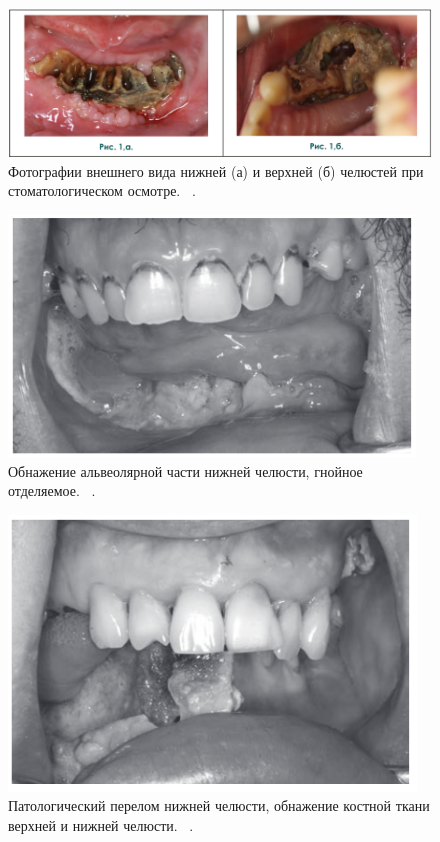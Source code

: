 \documentclass[11pt]{article}
\begin{document}
	\begin{figure}[H]
	\centering
	\includegraphics[width=\textwidth]{ris_2}
	\caption{Фотографии внешнего вида нижней (а) и верхней (б) челюстей при стоматологическом 
		осмотре. ~\cite{rejr}.}
	\label{fig:ris_2}
	\end{figure}
	
	\begin{figure}[H]
	\centering
	\includegraphics[width=\textwidth]{st1}
	\caption{Обнажение альвеолярной части нижней челюсти, гнойное отделяемое. ~\cite{st}.}
	\label{fig:st1}
	\end{figure}

	\begin{figure}[H]
		\centering
		\includegraphics[width=\textwidth]{st2}
		\caption{Патологический перелом нижней челюсти, обнажение костной ткани верхней и нижней челюсти. ~\cite{st}.}
		\label{fig:st2}
	\end{figure}
\end{document}
